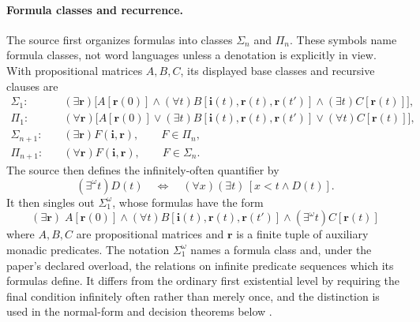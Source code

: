 \paragraph{Formula classes and recurrence.}
The source first organizes formulas into classes \(\Sigma_n\) and \(\Pi_n\).
These symbols name formula classes, not word languages unless a denotation is
explicitly in view.  With propositional matrices \(A,B,C\), its displayed
base classes and recursive clauses are
\[
\begin{aligned}
 \Sigma_1:\quad
 &(\exists\mathbf r)\bigl[
 A[\mathbf r(0)]
 \land(\forall t)B[\mathbf i(t),\mathbf r(t),\mathbf r(t')]
 \land(\exists t)C[\mathbf r(t)]\bigr],\\
 \Pi_1:\quad
 &(\forall\mathbf r)\bigl[
 A[\mathbf r(0)]
 \lor(\exists t)B[\mathbf i(t),\mathbf r(t),\mathbf r(t')]
 \lor(\forall t)C[\mathbf r(t)]\bigr],\\
 \Sigma_{n+1}:\quad
 &(\exists\mathbf r)F(\mathbf i,\mathbf r),
 \qquad F\in\Pi_n,\\
 \Pi_{n+1}:\quad
 &(\forall\mathbf r)F(\mathbf i,\mathbf r),
 \qquad F\in\Sigma_n.
\end{aligned}
\]
The source then defines the infinitely-often quantifier by
\[
 (\exists^\omega t)D(t)
 \quad\Longleftrightarrow\quad
 (\forall x)(\exists t)\,[x<t\land D(t)].
\]
It then singles out \(\Sigma_1^\omega\), whose formulas have the form
\[
 (\exists\mathbf r)\;
 A[\mathbf r(0)]
 \land
 (\forall t)B[\mathbf i(t),\mathbf r(t),\mathbf r(t')]
 \land
 (\exists^\omega t)C[\mathbf r(t)]
\]
where \(A,B,C\) are propositional matrices and \(\mathbf r\) is a finite tuple
of auxiliary monadic predicates.  The notation \(\Sigma_1^\omega\) names a
formula class and, under the paper's declared overload, the relations on
infinite predicate sequences which its formulas define.  It differs from the
ordinary first existential level by requiring the final condition infinitely
often rather than merely once, and the distinction is used in the normal-form
and decision theorems below \cite[pp.~2--3]{Buchi1962}.

